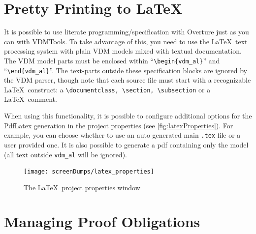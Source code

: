 \documentclass{overturerepchap}
\begin{document}
\chapter{Pretty Printing to \LaTeX}\label{sec:prettyprint}


It is possible to use literate programming/specification \cite{Johnson96} with
Overture just as you can with VDMTools. To take advantage of this,
you need to use the \LaTeX\ text processing system with
plain VDM models mixed with textual documentation.  The VDM model parts must be
enclosed within ``\verb+\begin{vdm_al}+'' and ``\verb+\end{vdm_al}+''. The
text-parts outside these specification blocks are ignored by the VDM parser,
though note that each source file must start with a recognizable \LaTeX\
construct: a \verb+\documentclass, \section, \subsection+ or a \LaTeX\ comment.

When using this functionality, it is possible to configure additional options
for the PdfLatex generation in the project properties (see
\autoref{fig:latexProperties}). For example, you can choose whether to use an
auto generated main \texttt{.tex} file or a user provided one.  It is also possible to
generate a pdf containing only the model (all text outside \texttt{vdm\_al}
will be ignored).

\begin{figure}[!htb]
\begin{center}
  \texttt{[image: screenDumps/latex\_properties]}
  \caption{The \LaTeX\ project properties window}
  \label{fig:latexProperties}
\end{center}
\end{figure}


\chapter{Managing Proof Obligations}\label{sec:POmanagement}
\end{document}
